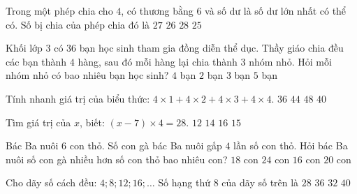 \begin{ex} %
Trong một phép chia cho $4$, có thương bằng $6$ và số dư là số dư lớn nhất có thể có. Số bị chia của phép chia đó là
\choice
{\True $27$}
{$26$}
{$28$}
{$25$}
\end{ex}

\begin{ex} %
Khối lớp 3 có $36$ bạn học sinh tham gia đồng diễn thể dục. Thầy giáo chia đều các bạn thành $4$ hàng, sau đó mỗi hàng lại chia thành $3$ nhóm nhỏ. Hỏi mỗi nhóm nhỏ có bao nhiêu bạn học sinh?
\choice
{$4$ bạn}
{$2$ bạn}
{\True $3$ bạn}
{$5$ bạn}
\end{ex}

\begin{ex} %
Tính nhanh giá trị của biểu thức: $4 \times 1 + 4 \times 2 + 4 \times 3 + 4 \times 4$.
\choice
{$36$}
{$44$}
{$48$}
{\True $40$}
\end{ex}

\begin{ex} %
Tìm giá trị của $x$, biết: $(x - 7) \times 4 = 28$.
\choice
{$12$}
{\True $14$}
{$16$}
{$15$}
\end{ex}

\begin{ex} %
Bác Ba nuôi $6$ con thỏ. Số con gà bác Ba nuôi gấp $4$ lần số con thỏ. Hỏi bác Ba nuôi số con gà nhiều hơn số con thỏ bao nhiêu con?
\choice
{\True $18$ con}
{$24$ con}
{$16$ con}
{$20$ con}
\end{ex}

\begin{ex} %
Cho dãy số cách đều: $4; 8; 12; 16; \dots$ Số hạng thứ 8 của dãy số trên là
\choice
{$28$}
{$36$}
{\True $32$}
{$40$}
\end{ex}

